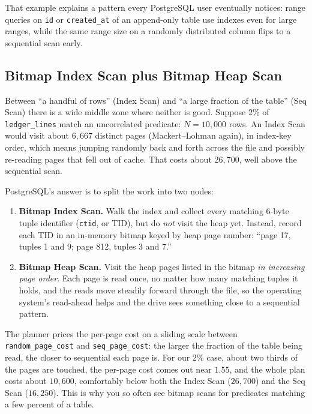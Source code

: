 That example explains a pattern every PostgreSQL user eventually notices: range queries on \texttt{id} or \texttt{created\_at} of an append-only table use indexes even for large ranges, while the same range size on a randomly distributed column flips to a sequential scan early.

\subsection{Bitmap Index Scan plus Bitmap Heap Scan}

Between ``a handful of rows'' (Index Scan) and ``a large fraction of the table'' (Seq Scan) there is a wide middle zone where neither is good. Suppose 2\% of \texttt{ledger\_lines} match an uncorrelated predicate: $N = 10{,}000$ rows. An Index Scan would visit about $6{,}667$ distinct pages (Mackert--Lohman again), in index-key order, which means jumping randomly back and forth across the file and possibly re-reading pages that fell out of cache. That costs about $26{,}700$, well above the sequential scan.

PostgreSQL's answer is to split the work into two nodes:
\begin{enumerate}
  \item \textbf{Bitmap Index Scan.} Walk the index and collect every matching 6-byte tuple identifier (\texttt{ctid}, or TID), but do \emph{not} visit the heap yet. Instead, record each TID in an in-memory bitmap keyed by heap page number: ``page 17, tuples 1 and 9; page 812, tuples 3 and 7.''
  \item \textbf{Bitmap Heap Scan.} Visit the heap pages listed in the bitmap \emph{in increasing page order}. Each page is read once, no matter how many matching tuples it holds, and the reads move steadily forward through the file, so the operating system's read-ahead helps and the drive sees something close to a sequential pattern.
\end{enumerate}

The planner prices the per-page cost on a sliding scale between \texttt{random\_page\_cost} and \texttt{seq\_page\_cost}: the larger the fraction of the table being read, the closer to sequential each page is. For our 2\% case, about two thirds of the pages are touched, the per-page cost comes out near $1.55$, and the whole plan costs about $10{,}600$, comfortably below both the Index Scan ($26{,}700$) and the Seq Scan ($16{,}250$). This is why you so often see bitmap scans for predicates matching a few percent of a table.

